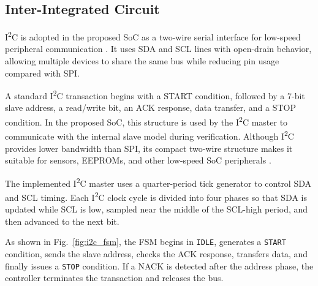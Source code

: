 \documentclass[runningheads]{llncs}
\begin{document}
\subsection{Inter-Integrated Circuit}

I\textsuperscript{2}C is adopted in the proposed SoC as a two-wire serial interface for low-speed peripheral communication \cite{i2cspec}. It uses SDA and SCL lines with open-drain behavior, allowing multiple devices to share the same bus while reducing pin usage compared with SPI.

A standard I\textsuperscript{2}C transaction begins with a START condition, followed by a 7-bit slave address, a read/write bit, an ACK response, data transfer, and a STOP condition. In the proposed SoC, this structure is used by the I\textsuperscript{2}C master to communicate with the internal slave model during verification. Although I\textsuperscript{2}C provides lower bandwidth than SPI, its compact two-wire structure makes it suitable for sensors, EEPROMs, and other low-speed SoC peripherals \cite{mazidi2018}.

The implemented I\textsuperscript{2}C master uses a quarter-period tick generator to control SDA and SCL timing. Each I\textsuperscript{2}C clock cycle is divided into four phases so that SDA is updated while SCL is low, sampled near the middle of the SCL-high period, and then advanced to the next bit.

As shown in Fig.~\ref{fig:i2c_fsm}, the FSM begins in \texttt{IDLE}, generates a \texttt{START} condition, sends the slave address, checks the ACK response, transfers data, and finally issues a \texttt{STOP} condition. If a NACK is detected after the address phase, the controller terminates the transaction and releases the bus.
\end{document}
